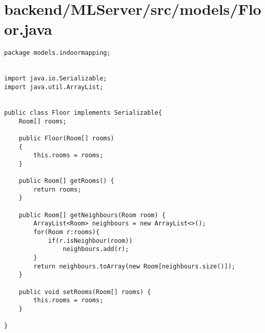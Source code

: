 \section{backend/MLServer/src/models/Floor.java}
\begin{lstlisting}package models.indoormapping;


import java.io.Serializable;
import java.util.ArrayList;


public class Floor implements Serializable{
    Room[] rooms;

    public Floor(Room[] rooms)
    {
        this.rooms = rooms;
    }

    public Room[] getRooms() {
        return rooms;
    }

    public Room[] getNeighbours(Room room) {
        ArrayList<Room> neighbours = new ArrayList<>();
        for(Room r:rooms){
            if(r.isNeighbour(room))
                neighbours.add(r);
        }
        return neighbours.toArray(new Room[neighbours.size()]);
    }

    public void setRooms(Room[] rooms) {
        this.rooms = rooms;
    }

}
\end{lstlisting}
\newpage
